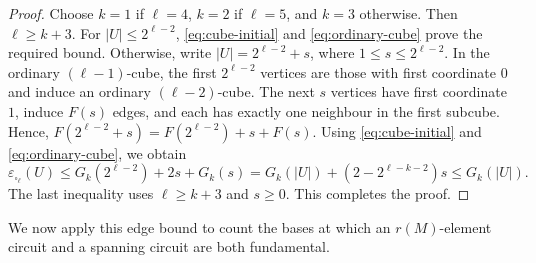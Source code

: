 \documentclass[11pt]{article}
\numberwithin{equation}{section}
\begin{document}
\begin{proof}
Choose \(k=1\) if \(\ell=4\), \(k=2\) if \(\ell=5\), and
\(k=3\) otherwise. Then \(\ell\ge k+3\).
For \(|U|\le2^{\ell-2}\), \eqref{eq:cube-initial} and
\eqref{eq:ordinary-cube} prove the required bound.
Otherwise, write \(|U|=2^{\ell-2}+s\), where \(1\le s\le2^{\ell-2}\).
In the ordinary \((\ell-1)\)-cube, the first \(2^{\ell-2}\) vertices
are those with first coordinate \(0\) and induce an ordinary \((\ell-2)\)-cube.
The next \(s\) vertices have first coordinate \(1\), induce \(F(s)\) edges,
and each has exactly one neighbour in the first subcube. Hence,
\(F(2^{\ell-2}+s)=F(2^{\ell-2})+s+F(s)\).
Using \eqref{eq:cube-initial} and \eqref{eq:ordinary-cube}, we obtain
\[
\varepsilon_{\square_\ell}(U)\le G_k(2^{\ell-2})+2s+G_k(s)
=G_k(|U|)+(2-2^{\ell-k-2})s\le G_k(|U|).
\]
The last inequality uses \(\ell\ge k+3\) and \(s\ge0\).
This completes the proof.
\end{proof}


We now apply this edge bound to count the bases at which an
\(r(M)\)-element circuit and a spanning circuit are both fundamental.
\end{document}
